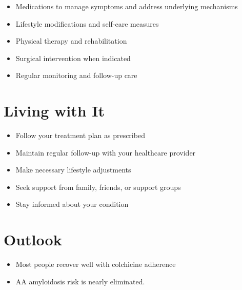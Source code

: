 \begin{itemize}[noitemsep]
  \item Medications to manage symptoms and address underlying mechanisms
  \item Lifestyle modifications and self-care measures
  \item Physical therapy and rehabilitation
  \item Surgical intervention when indicated
  \item Regular monitoring and follow-up care
\end{itemize}
\section{Living with It}
\begin{itemize}[noitemsep]
  \item Follow your treatment plan as prescribed
  \item Maintain regular follow-up with your healthcare provider
  \item Make necessary lifestyle adjustments
  \item Seek support from family, friends, or support groups
  \item Stay informed about your condition
\end{itemize}
\section{Outlook}
\begin{itemize}[noitemsep]
  \item Most people recover well with colchicine adherence
  \item AA amyloidosis risk is nearly eliminated.
\end{itemize}
